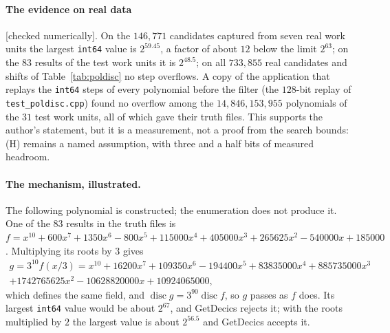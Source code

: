 \documentclass[10pt,a4paper]{article}
\DeclareMathOperator{\disc}{disc}
\newcommand{\code}[1]{\texttt{#1}}
\newcommand{\stnum}{\textsf{\small[checked numerically]}\xspace}
\theoremstyle{plain}
\theoremstyle{definition}
\begin{document}
\paragraph{The evidence on real data} \stnum.  On the $146{,}771$ candidates captured from seven real work units the largest \code{int64} value is $2^{59.45}$, a factor
of about $12$ below the limit $2^{63}$; on the $83$ results of the test work units it is $2^{48.5}$; on all $733{,}855$ real candidates and shifts of
Table~\ref{tab:poldisc} no step overflows.  A copy of the application that replays the \code{int64} steps of every polynomial before the filter (the $128$-bit replay of
\code{test\_poldisc.cpp}) found no overflow among the $14{,}846{,}153{,}955$ polynomials of the $31$ test work units, all of which gave their truth files.  This
supports the author's statement, but it is a measurement, not a proof from the search bounds: (H) remains a named assumption, with three and a half bits of measured
headroom.

\paragraph{The mechanism, illustrated.}  The following polynomial is constructed; the enumeration does not produce it.  One of the $83$ results in the truth files is
$f=x^{10}+600x^7+1350x^6-800x^5+115000x^4+405000x^3+265625x^2-540000x+185000$.  Multiplying its roots by $3$ gives
\begin{multline*}
g=3^{10}f(x/3)=x^{10}+16200x^7+109350x^6-194400x^5+83835000x^4+885735000x^3\\
+1742765625x^2-10628820000x+10924065000 ,
\end{multline*}
which defines the same field, and $\disc g=3^{90}\disc f$, so $g$ passes as $f$ does.  Its largest \code{int64} value would be about $2^{67}$, and GetDecics
rejects it; with the roots multiplied by $2$ the largest value is about $2^{56.5}$ and GetDecics accepts it.
\end{document}
